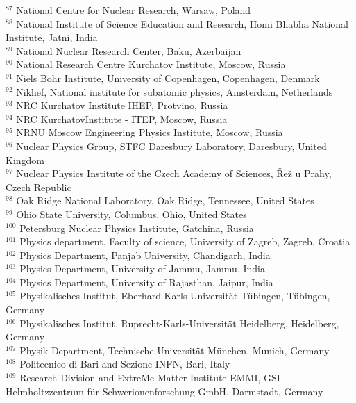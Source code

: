 \begin{flushleft}
$^{87}$ National Centre for Nuclear Research, Warsaw, Poland\\
$^{88}$ National Institute of Science Education and Research, Homi Bhabha National Institute, Jatni, India\\
$^{89}$ National Nuclear Research Center, Baku, Azerbaijan\\
$^{90}$ National Research Centre Kurchatov Institute, Moscow, Russia\\
$^{91}$ Niels Bohr Institute, University of Copenhagen, Copenhagen, Denmark\\
$^{92}$ Nikhef, National institute for subatomic physics, Amsterdam, Netherlands\\
$^{93}$ NRC Kurchatov Institute IHEP, Protvino, Russia\\
$^{94}$ NRC \guillemotleft Kurchatov\guillemotright  Institute - ITEP, Moscow, Russia\\
$^{95}$ NRNU Moscow Engineering Physics Institute, Moscow, Russia\\
$^{96}$ Nuclear Physics Group, STFC Daresbury Laboratory, Daresbury, United Kingdom\\
$^{97}$ Nuclear Physics Institute of the Czech Academy of Sciences, \v{R}e\v{z} u Prahy, Czech Republic\\
$^{98}$ Oak Ridge National Laboratory, Oak Ridge, Tennessee, United States\\
$^{99}$ Ohio State University, Columbus, Ohio, United States\\
$^{100}$ Petersburg Nuclear Physics Institute, Gatchina, Russia\\
$^{101}$ Physics department, Faculty of science, University of Zagreb, Zagreb, Croatia\\
$^{102}$ Physics Department, Panjab University, Chandigarh, India\\
$^{103}$ Physics Department, University of Jammu, Jammu, India\\
$^{104}$ Physics Department, University of Rajasthan, Jaipur, India\\
$^{105}$ Physikalisches Institut, Eberhard-Karls-Universit\"{a}t T\"{u}bingen, T\"{u}bingen, Germany\\
$^{106}$ Physikalisches Institut, Ruprecht-Karls-Universit\"{a}t Heidelberg, Heidelberg, Germany\\
$^{107}$ Physik Department, Technische Universit\"{a}t M\"{u}nchen, Munich, Germany\\
$^{108}$ Politecnico di Bari and Sezione INFN, Bari, Italy\\
$^{109}$ Research Division and ExtreMe Matter Institute EMMI, GSI Helmholtzzentrum f\"ur Schwerionenforschung GmbH, Darmstadt, Germany\\

\end{flushleft}
